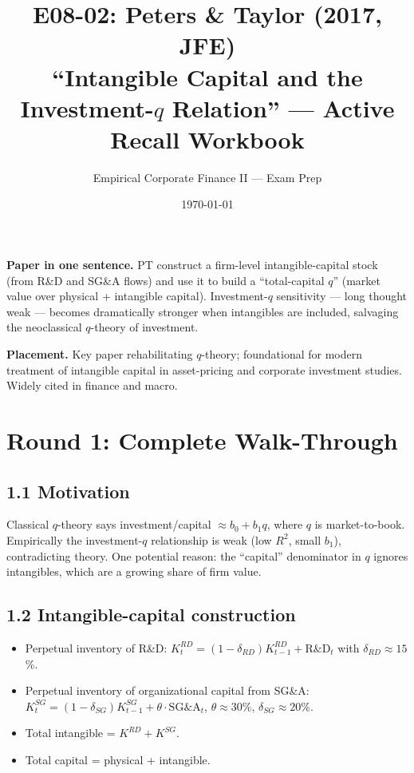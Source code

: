 \documentclass[11pt]{article}
\title{E08-02: Peters \& Taylor (2017, JFE) \\
\large ``Intangible Capital and the Investment-$q$ Relation'' --- Active Recall Workbook}
\author{Empirical Corporate Finance II --- Exam Prep}
\date{\today}
\begin{document}
\maketitle

\begin{keybox}
\textbf{Paper in one sentence.} PT construct a firm-level intangible-capital stock (from R\&D and SG\&A flows) and use it to build a ``total-capital $q$'' (market value over physical + intangible capital). Investment-$q$ sensitivity --- long thought weak --- becomes dramatically stronger when intangibles are included, salvaging the neoclassical $q$-theory of investment.

\textbf{Placement.} Key paper rehabilitating $q$-theory; foundational for modern treatment of intangible capital in asset-pricing and corporate investment studies. Widely cited in finance and macro.
\end{keybox}

\section*{Round 1: Complete Walk-Through}

\subsection*{1.1 Motivation}
Classical $q$-theory says investment/capital $\approx b_0 + b_1 q$, where $q$ is market-to-book. Empirically the investment-$q$ relationship is weak (low $R^2$, small $b_1$), contradicting theory. One potential reason: the ``capital'' denominator in $q$ ignores intangibles, which are a growing share of firm value.

\subsection*{1.2 Intangible-capital construction}
\begin{itemize}
\item Perpetual inventory of R\&D: $K^{RD}_t=(1-\delta_{RD})K^{RD}_{t-1}+\text{R\&D}_t$ with $\delta_{RD}\approx 15$\%.
\item Perpetual inventory of organizational capital from SG\&A: $K^{SG}_t=(1-\delta_{SG})K^{SG}_{t-1}+\theta\cdot\text{SG\&A}_t$, $\theta\approx 30$\%, $\delta_{SG}\approx 20$\%.
\item Total intangible = $K^{RD}+K^{SG}$.
\item Total capital = physical + intangible.
\end{itemize}
\end{document}
